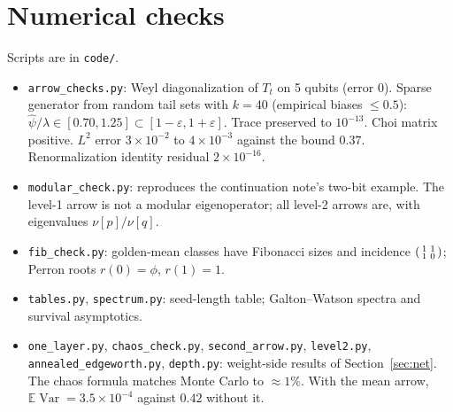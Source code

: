 \documentclass[11pt]{article}
\theoremstyle{definition}
\theoremstyle{remark}
\newcommand{\E}{\mathbb E}
\newcommand{\Var}{\operatorname{Var}}
\begin{document}
\section{Numerical checks}\label{app:num}
Scripts are in \texttt{code/}.
\begin{itemize}
\item \texttt{arrow\_checks.py}: Weyl diagonalization of $T_t$ on 5 qubits (error $0$). Sparse generator from random tail sets with $k=40$ (empirical biases $\le0.5$): $\hat\psi/\lambda\in[0.70,1.25]\subset[1-\varepsilon,1+\varepsilon]$. Trace preserved to $10^{-13}$. Choi matrix positive. $L^2$ error $3\times10^{-2}$ to $4\times10^{-3}$ against the bound $0.37$. Renormalization identity residual $2\times10^{-16}$.
\item \texttt{modular\_check.py}: reproduces the continuation note's two-bit example. The level-1 arrow is not a modular eigenoperator; all level-2 arrows are, with eigenvalues $\nu[p]/\nu[q]$.
\item \texttt{fib\_check.py}: golden-mean classes have Fibonacci sizes and incidence $\begin{psmallmatrix}1&1\\1&0\end{psmallmatrix}$; Perron roots $r(0)=\phi$, $r(1)=1$.
\item \texttt{tables.py}, \texttt{spectrum.py}: seed-length table; Galton--Watson spectra and survival asymptotics.
\item \texttt{one\_layer.py}, \texttt{chaos\_check.py}, \texttt{second\_arrow.py}, \texttt{level2.py}, \texttt{annealed\_edgeworth.py}, \texttt{depth.py}: weight-side results of Section~\ref{sec:net}. The chaos formula matches Monte Carlo to $\approx1\%$. With the mean arrow, $\E\Var=3.5\times10^{-4}$ against $0.42$ without it.
\end{itemize}
\end{document}
